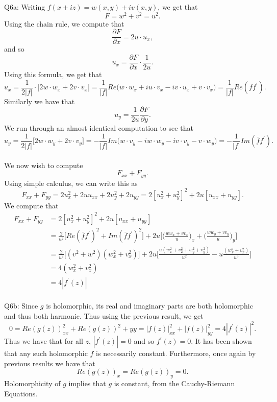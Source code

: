 \documentclass[letterpaper]{article}
\newcommand{\ol}{\overline}
\begin{document}
\noindent Q6a: Writing $f(x+iz) = w(x,y)+ iv(x,y)$, we get that $$F = w^2 + v^2 = u^2. $$ Using the chain rule, we compute that $$\frac{\partial F}{\partial x} = 2u \cdot u_x,$$ and so $$u_x = \frac{\partial F}{\partial x}\cdot \frac{1}{2u}.$$
Using this formula, we get that $$u_x = \frac{1}{2|f|} \cdot \Big[ 2w\cdot w_x+ 2v\cdot v_x \Big] = \frac{1}{|f|} Re\Big( w\cdot w_x + i u\cdot v_x -iv\cdot u_x + v\cdot v_x \Big) = \frac{1}{|f|} Re(\ol{f}f^\prime). $$
Similarly we have that $$u_y = \frac{1}{2u} \frac{\partial F}{\partial y}.$$
We run through an almost identical computation to see that $$u_y = \frac{1}{2|f|} \Big[ 2w \cdot w_y + 2v \cdot v_y \Big] = - \frac{1}{|f|} Im \Big( w \cdot v_y - i w \cdot w_y -iv \cdot v_y - v \cdot w_y \Big) = -\frac{1}{|f|}Im(\ol{f} f^\prime).$$
\newline \\ We now wish to compute $$F_{xx} + F_{yy}.$$
Using simple calculus, we can write this as $$F_{xx} + F_{yy} = 2u_x^2 + 2u u_{xx} + 2u_y^2 + 2u_{yy} = 2[u_x^2 + u_y^2]^2 + 2u[u_{xx} + u_{yy}].$$
We compute that 
\begin{align*}
    F_{xx} + F_{yy} & = 2[u_x^2 + u_y^2]^2 + 2u[u_{xx} + u_{yy}] 
    \\ & = \frac{2}{u^2} \Big[Re(\ol{f} f^\prime)^2 + Im(\ol{f} f^\prime)^2 \Big] + 2u \Big[\Big(\frac{ww_x + vv_x}{u} \Big)_x +  \Big( \frac{ww_y + vv_y}{u} \Big)_y\Big]
    \\ & = \frac{2}{u^2} \Big[(v^2+w^2)(w_x^2 + v_x^2) \Big] + 2u \Big[ \frac{u(w_x^2+v_2^2+ w_y^2 + v_y^2)}{u^2} - u\frac{(w_x^2 + v_x^2)}{u^3} \Big] \tag{simplifying above }
    \\ & = 4(w_x^2 + v_x^2)
    \\ & = 4|f^\prime(z)|
\end{align*}
\newline \\ Q6b: Since $g$ is holomorphic, its real and imaginary parts are both holomorphic and thus both harmonic. Thus using the previous result, we get $$0 = Re(g(z))^2_{xx} + Re (g(z))^2+{yy} = |f(z)|^2_{xx} + |f(z)|^2_{yy} = 4|f^\prime(z)|^2.$$ Thus we have that for all $z$, $|f^\prime(z)|=0$ and so $f^\prime(z)=0. $ It has been shown that any such holomorphic $f$ is necessarily constant. Furthermore, once again by previous results we have that $$Re(g(z))_x = Re(g(z))_y =0.$$ Holomorphicity of $g$ implies that $g$ is constant, from the Cauchy-Riemann Equations.  
\end{document}
